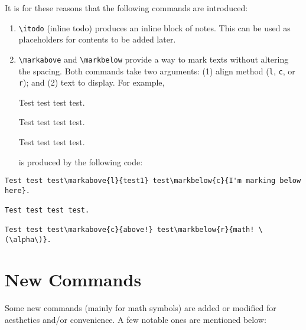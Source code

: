 \documentclass[10pt,letterpaper]{amsart}
\begin{document}
It is for these reasons that the following commands are introduced:
\begin{enumerate}[label=(\alph*)]
  \item \verb|\itodo| (inline todo) produces an inline block of notes. 
    This can be used as placeholders for contents to be added later. 
  \item \verb|\markabove| and \verb|\markbelow| provide a way to mark texts without altering the spacing. 
  Both commands take two arguments: (1) align method (\verb|l|, \verb|c|, or \verb|r|); and (2) text to display. 
  For example, 

  \begin{mdframed}
    \noindent
    Test test test test.

    \noindent
    Test test test test.

    \noindent
    Test test test test.
  \end{mdframed}
  is produced by the following code:
\end{enumerate}
\begin{verbatim}
Test test test\markabove{l}{test1} test\markbelow{c}{I'm marking below here}.

Test test test test.

Test test test\markabove{c}{above!} test\markbelow{r}{math! \(\alpha\)}.
\end{verbatim}




\section{New Commands}
Some new commands (mainly for math symbols) are added or modified for aesthetics and/or convenience.
A few notable ones are mentioned below:
\end{document}

